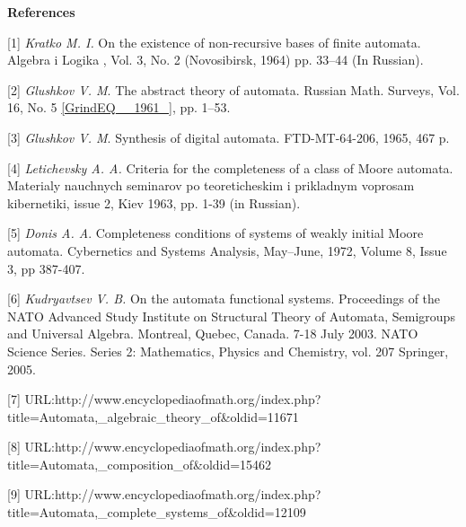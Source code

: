 \documentclass{article}
\begin{document}
\textbf{References}

[1] \textit{Kratko M. I.} On the existence of non-recursive bases of finite automata. Algebra i Logika , Vol. 3, No. 2 (Novosibirsk, 1964) pp. 33--44 (In Russian).

[2] \textit{Glushkov V. M}. The abstract theory of automata. Russian Math. Surveys, Vol. 16, No. 5 \eqref{GrindEQ__1961_}, pp. 1--53.

[3] \textit{Glushkov V. M}. Synthesis of digital automata. FTD-MT-64-206, 1965, 467 p.

[4] \textit{Letichevsky A. A.} Criteria for the completeness of a class of Moore automata. Materialy nauchnych seminarov po teoreticheskim i prikladnym voprosam kibernetiki, issue 2, Kiev 1963, pp. 1-39 (in Russian).

[5] \textit{Donis A. A}. Completeness conditions of systems of weakly initial Moore automata. Cybernetics and Systems Analysis, May--June, 1972, Volume 8, Issue 3, pp 387-407.

[6] \textit{Kudryavtsev} \textit{V. B.} On the automata functional systems. Proceedings of the NATO Advanced Study Institute on Structural Theory of Automata, Semigroups and Universal Algebra. Montreal, Quebec, Canada. 7-18 July 2003. NATO Science Series. Series 2: Mathematics, Physics and Chemistry, vol. 207 Springer, 2005.

[7] URL:http://www.encyclopediaofmath.org/index.php?title=Automata,\_algebraic\_theory\_of\&oldid=11671

[8] URL:http://www.encyclopediaofmath.org/index.php?title=Automata,\_composition\_of\&oldid=15462

[9] URL:http://www.encyclopediaofmath.org/index.php?title=Automata,\_complete\_systems\_of\&oldid=12109
\end{document}

